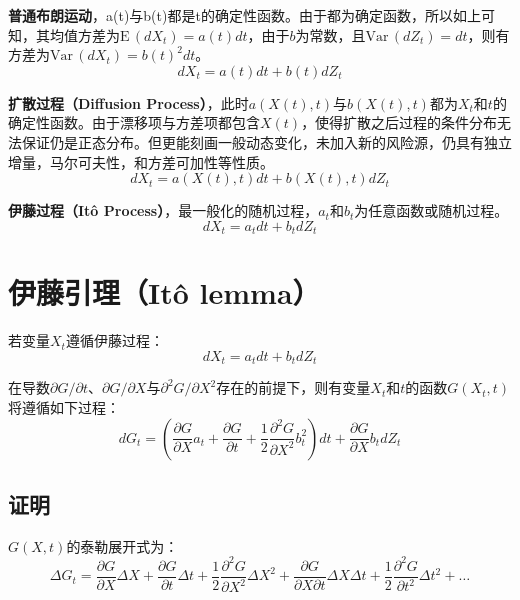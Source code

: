 \documentclass[11pt]{article}
\def\Var{{\textrm{Var}}\,}
\def\E{{\textrm{E}}\,}
\begin{document}
\textbf{普通布朗运动}，a(t)与b(t)都是t的确定性函数。由于都为确定函数，所以如上可知，其均值方差为$\E(dX_t) = a(t)dt$，由于$b$为常数，且$\Var(dZ_t)=dt$，则有方差为$\Var(dX_t)=b(t)^2 dt$。
\begin{equation*}
    dX_t =a(t) dt + b(t) dZ_t
\end{equation*}

\textbf{扩散过程（Diffusion Process）}，此时$a(X(t),t)$与$b(X(t),t)$都为$X_t$和$t$的确定性函数。由于漂移项与方差项都包含$X(t)$，使得扩散之后过程的条件分布无法保证仍是正态分布。但更能刻画一般动态变化，未加入新的风险源，仍具有独立增量，马尔可夫性，和方差可加性等性质。
\begin{equation*}
    dX_t =a(X(t),t) dt + b(X(t),t) dZ_t
\end{equation*}

\textbf{伊藤过程（Itô Process）}，最一般化的随机过程，$a_t$和$b_t$为任意函数或随机过程。
\begin{equation*}
    dX_t =a_t dt + b_t dZ_t
\end{equation*}

\section{伊藤引理（Itô lemma）}

若变量$X_t$遵循伊藤过程：
\begin{equation*}
    dX_t =a_t dt + b_t dZ_t
\end{equation*}

在导数$\partial G/\partial t$、$\partial G/\partial X$与$\partial^2 G/\partial X^2$存在的前提下，则有变量$X_t$和$t$的函数$G(X_t,t)$将遵循如下过程：
\begin{equation*}
    dG_t = \left(\frac{\partial G}{\partial X}a_t  + \frac{\partial G}{\partial t} + \frac{1}{2}\frac{\partial^2 G}{\partial X^2} b^2_t \right)dt + \frac{\partial G}{\partial X} b_t dZ_t
\end{equation*}

\subsection{证明}

$G(X,t)$的泰勒展开式为：
\begin{equation*}
    \Delta G_t = \frac{\partial G}{\partial X} \Delta X + \frac{\partial G}{\partial t} \Delta t + \frac{1}{2} \frac{\partial^2 G}{\partial X^2}\Delta X^2  + \frac{\partial G}{\partial X \partial t}\Delta X \Delta t + \frac{1}{2} \frac{\partial^2 G}{\partial t^2} \Delta t^2 + \dots
\end{equation*}
\end{document}
